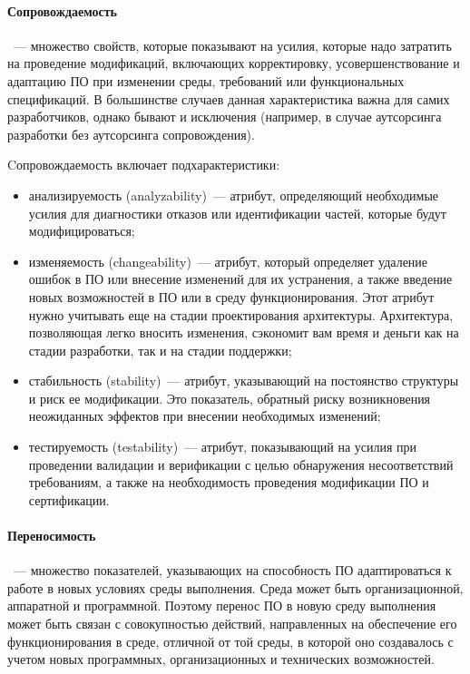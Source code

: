 \documentclass{../../text-style}
\begin{document}
\paragraph{Сопровождаемость}~--- множество свойств, которые показывают на усилия, которые надо затратить на проведение модификаций, включающих корректировку, усовершенствование и адаптацию ПО при изменении среды, требований или функциональных спецификаций. В большинстве случаев данная характеристика важна для самих разработчиков, однако бывают и исключения (например, в случае аутсорсинга разработки без аутсорсинга сопровождения).

Cопровождаемость включает подхарактеристики:

\begin{itemize}
    \item анализируемость (analyzability)~--- атрибут, определяющий необходимые усилия для диагностики отказов или идентификации частей, которые будут модифицироваться;
    \item изменяемость (changeability)~--- атрибут, который определяет удаление ошибок в ПО или внесение изменений для их устранения, а также введение новых возможностей в ПО или в среду функционирования. Этот атрибут нужно учитывать еще на стадии проектирования архитектуры. Архитектура, позволяющая легко вносить изменения, сэкономит вам время и деньги как на стадии разработки, так и на стадии поддержки;
    \item стабильность (stability)~--- атрибут, указывающий на постоянство структуры и риск ее модификации. Это показатель, обратный риску возникновения неожиданных эффектов при внесении необходимых изменений;
    \item тестируемость (testability)~--- атрибут, показывающий на усилия при проведении валидации и верификации с целью обнаружения несоответствий требованиям, а также на необходимость проведения модификации ПО и сертификации.
\end{itemize}

\paragraph{Переносимость}~--- множество показателей, указывающих на способность ПО адаптироваться к работе в новых условиях среды выполнения. Среда может быть организационной, аппаратной и программной. Поэтому перенос ПО в новую среду выполнения может быть связан с совокупностью действий, направленных на обеспечение его функционирования в среде, отличной от той среды, в которой оно создавалось с учетом новых программных, организационных и технических возможностей.
\end{document}
